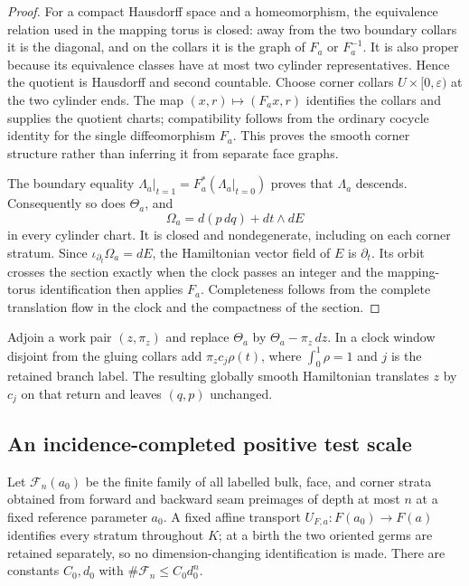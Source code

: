 \begin{proof}
For a compact Hausdorff space and a homeomorphism, the equivalence relation
used in the mapping torus is closed: away from the two boundary collars it is
the diagonal, and on the collars it is the graph of $F_a$ or $F_a^{-1}$.
It is also proper because its equivalence classes have at most two cylinder
representatives.  Hence the quotient is Hausdorff and second countable.
Choose corner collars $U\times[0,\varepsilon)$ at the two cylinder ends.  The
map $(x,r)\mapsto(F_a x,r)$ identifies the collars and supplies the quotient
charts; compatibility follows from the ordinary cocycle identity for the
single diffeomorphism $F_a$.  This proves the smooth corner structure rather
than inferring it from separate face graphs.

The boundary equality
$\Lambda_a|_{t=1}=F_a^*(\Lambda_a|_{t=0})$ proves that $\Lambda_a$ descends.
Consequently so does $\Theta_a$, and
\[
 \Omega_a=d(p\,dq)+dt\wedge dE
\]
in every cylinder chart.  It is closed and nondegenerate, including on each
corner stratum.  Since $\iota_{\partial_t}\Omega_a=dE$, the Hamiltonian vector
field of $E$ is $\partial_t$.  Its orbit crosses the section exactly when the
clock passes an integer and the mapping-torus identification then applies
$F_a$.  Completeness follows from the complete translation flow in the clock
and the compactness of the section.
\end{proof}

Adjoin a work pair $(z,\pi_z)$ and replace $\Theta_a$ by
$\Theta_a-\pi_z\,dz$.  In a clock window disjoint from the gluing collars add
$\pi_zc_j\rho(t)$, where $\int_0^1\rho=1$ and $j$ is the retained branch
label.  The resulting globally smooth Hamiltonian translates $z$ by $c_j$ on
that return and leaves $(q,p)$ unchanged.

\subsection{An incidence-completed positive test scale}

Let $\mathscr F_n(a_0)$ be the finite family of all labelled bulk, face, and
corner strata obtained from forward and backward seam preimages of depth at
most $n$ at a fixed reference parameter $a_0$.  A fixed affine transport
$U_{F,a}:F(a_0)\to F(a)$ identifies every stratum throughout $K$; at a birth
the two oriented germs are retained separately, so no dimension-changing
identification is made.  There are constants $C_0,d_0$ with
$\#\mathscr F_n\le C_0d_0^n$.

